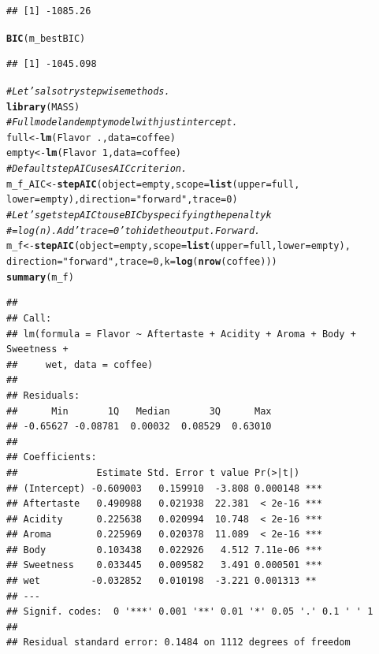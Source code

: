\documentclass[oneside]{book}\usepackage[]{graphicx}\usepackage[dvipsnames,table,xcdraw]{xcolor}
\makeatletter
\newcommand{\hlnum}[1]{\textcolor[rgb]{0.686,0.059,0.569}{#1}}%
\newcommand{\hlstr}[1]{\textcolor[rgb]{0.192,0.494,0.8}{#1}}%
\newcommand{\hlcom}[1]{\textcolor[rgb]{0.678,0.584,0.686}{\textit{#1}}}%
\newcommand{\hlopt}[1]{\textcolor[rgb]{0,0,0}{#1}}%
\newcommand{\hlstd}[1]{\textcolor[rgb]{0.345,0.345,0.345}{#1}}%
\newcommand{\hlkwb}[1]{\textcolor[rgb]{0.69,0.353,0.396}{#1}}%
\newcommand{\hlkwc}[1]{\textcolor[rgb]{0.333,0.667,0.333}{#1}}%
\newcommand{\hlkwd}[1]{\textcolor[rgb]{0.737,0.353,0.396}{\textbf{#1}}}%
\newenvironment{kframe}{%
 \def\at@end@of@kframe{}%
 \ifinner\ifhmode%
  \def\at@end@of@kframe{\end{minipage}}%
  \begin{minipage}{\columnwidth}%
 \fi\fi%
 \def\FrameCommand##1{\hskip\@totalleftmargin \hskip-\fboxsep
 \colorbox{shadecolor}{##1}\hskip-\fboxsep
     \hskip-\linewidth \hskip-\@totalleftmargin \hskip\columnwidth}%
 \MakeFramed {\advance\hsize-\width
   \@totalleftmargin\z@ \linewidth\hsize
   \@setminipage}}%
 {\par\unskip\endMakeFramed%
 \at@end@of@kframe}
\newenvironment{knitrout}{}{} %
\makeatother
\begin{document}
\begin{knitrout}
\begin{kframe}
\begin{alltt}
\end{alltt}
\begin{verbatim}
## [1] -1085.26
\end{verbatim}
\begin{alltt}
\hlkwd{BIC}\hlstd{(m_bestBIC)}
\end{alltt}
\begin{verbatim}
## [1] -1045.098
\end{verbatim}
\begin{alltt}
\hlcom{# Let's also try stepwise methods.}
\hlkwd{library}\hlstd{(MASS)}
\hlcom{# Full model and empty model with just intercept.}
\hlstd{full} \hlkwb{<-} \hlkwd{lm}\hlstd{(Flavor} \hlopt{~} \hlstd{.,} \hlkwc{data} \hlstd{= coffee)}
\hlstd{empty} \hlkwb{<-} \hlkwd{lm}\hlstd{(Flavor} \hlopt{~} \hlnum{1}\hlstd{,} \hlkwc{data} \hlstd{= coffee)}
\hlcom{# Default stepAIC uses AIC criterion.}
\hlstd{m_f_AIC} \hlkwb{<-} \hlkwd{stepAIC}\hlstd{(}\hlkwc{object} \hlstd{= empty,} \hlkwc{scope} \hlstd{=} \hlkwd{list}\hlstd{(}\hlkwc{upper} \hlstd{= full,}
  \hlkwc{lower} \hlstd{= empty),} \hlkwc{direction} \hlstd{=} \hlstr{"forward"}\hlstd{,} \hlkwc{trace} \hlstd{=} \hlnum{0}\hlstd{)}
\hlcom{# Let's get stepAIC to use BIC by specifying the penalty k}
\hlcom{# = log(n).  Add 'trace = 0' to hide the output.  Forward.}
\hlstd{m_f} \hlkwb{<-} \hlkwd{stepAIC}\hlstd{(}\hlkwc{object} \hlstd{= empty,} \hlkwc{scope} \hlstd{=} \hlkwd{list}\hlstd{(}\hlkwc{upper} \hlstd{= full,} \hlkwc{lower} \hlstd{= empty),}
  \hlkwc{direction} \hlstd{=} \hlstr{"forward"}\hlstd{,} \hlkwc{trace} \hlstd{=} \hlnum{0}\hlstd{,} \hlkwc{k} \hlstd{=} \hlkwd{log}\hlstd{(}\hlkwd{nrow}\hlstd{(coffee)))}
\hlkwd{summary}\hlstd{(m_f)}
\end{alltt}
\begin{verbatim}
## 
## Call:
## lm(formula = Flavor ~ Aftertaste + Acidity + Aroma + Body + Sweetness + 
##     wet, data = coffee)
## 
## Residuals:
##      Min       1Q   Median       3Q      Max 
## -0.65627 -0.08781  0.00032  0.08529  0.63010 
## 
## Coefficients:
##              Estimate Std. Error t value Pr(>|t|)    
## (Intercept) -0.609003   0.159910  -3.808 0.000148 ***
## Aftertaste   0.490988   0.021938  22.381  < 2e-16 ***
## Acidity      0.225638   0.020994  10.748  < 2e-16 ***
## Aroma        0.225969   0.020378  11.089  < 2e-16 ***
## Body         0.103438   0.022926   4.512 7.11e-06 ***
## Sweetness    0.033445   0.009582   3.491 0.000501 ***
## wet         -0.032852   0.010198  -3.221 0.001313 ** 
## ---
## Signif. codes:  0 '***' 0.001 '**' 0.01 '*' 0.05 '.' 0.1 ' ' 1
## 
## Residual standard error: 0.1484 on 1112 degrees of freedom

\end{verbatim}
\end{kframe}
\end{knitrout}
\end{document}
